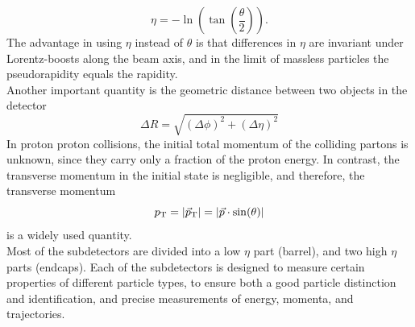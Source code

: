 \begin{equation}
 \eta=-\ln\left(\tan\left(\frac{\theta}{2}\right)\right).
\end{equation}
The advantage in using $\eta$ instead of $\theta$ is that differences in $\eta$ are invariant under Lorentz-boosts along the beam axis, and in the limit of massless particles the pseudorapidity equals the rapidity.\\
Another important quantity is the geometric distance between two objects in the detector
\begin{equation}
 \Delta R = \sqrt{(\Delta\phi)^2 + (\Delta\eta)^2}
\end{equation}
In proton proton collisions, the initial total momentum of the colliding partons is unknown, since they carry only a fraction of the proton energy. In contrast, the transverse momentum in the initial state is negligible, and therefore, the transverse momentum
\begin{equation}
 p_{\mathrm{T}}=|{\vec p}_{\mathrm{T}}|=|\vec{p}\cdot\sin(\theta)|
\end{equation}
is a widely used quantity.\\
Most of the subdetectors are divided into a low $\eta$ part (barrel), and two high $\eta$ parts (endcaps). Each of the subdetectors is designed to measure certain properties of different particle types, to ensure both a good particle distinction and identification, and precise measurements of energy, momenta, and trajectories.



